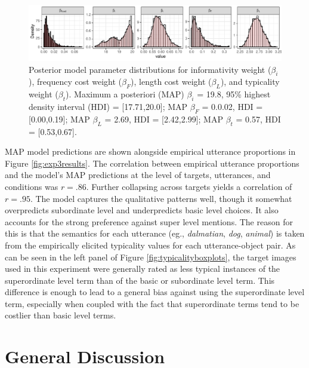 \documentclass[11pt]{article}
\newcommand{\figref}[1]{Figure \ref{#1}}
\begin{document}
\begin{figure}
\centering
\includegraphics[width=\textwidth]{pics/exp3-paramposteriors}
\caption{Posterior model parameter distributions for informativity weight ($\beta_i$), frequency cost weight  ($\beta_{F}$), length cost weight ($\beta_{L}$), and typicality weight ($\beta_t $). Maximum a posteriori (MAP)  $\beta_i$ = 19.8, 95\% highest density interval (HDI) = [17.71,20.0]; MAP $\beta_{F}$ = 0.0.02, HDI = [0.00,0.19]; MAP $\beta_{L}$ = 2.69, HDI = [2.42,2.99]; MAP $\beta_t $ = 0.57, HDI = [0.53,0.67].}
\label{fig:nomparamposteriors}
\end{figure}

MAP model  predictions are shown alongside empirical utterance proportions in \figref{fig:exp3results}. 
The correlation between empirical utterance proportions and the model's MAP predictions at the level of targets, utterances, and conditions was $r = .86$. Further collapsing across targets yields a correlation of $r = .95$.
The model captures the qualitative patterns well, though it somewhat overpredicts subordinate level  and underpredicts basic level choices. It also accounts for the strong preference against super level mentions. The reason for this is that the semantics for each utterance (eg., \emph{dalmatian}, \emph{dog}, \emph{animal}) is taken from the empirically elicited typicality values for each utterance-object pair. As can be seen in the left panel of \figref{fig:typicalityboxplots},  the target images used in this experiment were generally rated as less typical instances of the superordinate level term than of the basic or subordinate level term. This difference is enough to lead to a general bias against using the superordinate level term, especially when coupled with the fact that superordinate terms tend to be costlier than basic level terms.


\section{General Discussion}
\label{sec:gd}
\end{document}
